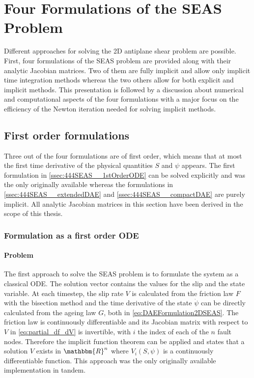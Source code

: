 \chapter{Four Formulations of the SEAS Problem}
\label{chap:44rmulations4SEAS}
Different approaches for solving the 2D antiplane shear problem are possible. First, four formulations of the SEAS problem are provided along with their analytic Jacobian matrices. Two of them are fully implicit and allow only implicit time integration methods whereas the two others allow for both explicit and implicit methods. This presentation is followed by a discussion about numerical and computational aspects of the four formulations with a major focus on the efficiency of the Newton iteration needed for solving implicit methods.

\section{First order formulations}
\label{sec:44mul4SEAS__1stOrderODE}
Three out of the four formulations are of first order, which means that at most the first time derivative of the physical quantities $S$ and $\psi$ appears. The first formulation in \autoref{ssec:444SEAS__1stOrderODE} can be solved explicitly and was the only originally available whereas the formulations in \autoref{ssec:444SEAS__extendedDAE} and \autoref{ssec:444SEAS__compactDAE} are purely implicit. All analytic Jacobian matrices in this section have been derived in the scope of this thesis.

\subsection{Formulation as a first order ODE}
\label{ssec:444SEAS__1stOrderODE}
\subsubsection{Problem}
The first approach to solve the SEAS problem is to formulate the system as a classical ODE. The solution vector contains the values for the slip and the state variable. At each timestep, the slip rate $V$ is calculated from the friction law $F$ with the bisection method and the time derivative of the state $\dot{\psi}$ can be directly calculated from the ageing law $G$, both in \autoref{eq:DAEFormulation2DSEAS}. The friction law is continuously differentiable and its Jacobian matrix with respect to $V$ in \autoref{eq:partial_df_dV} is invertible, with $i$ the index of each of the $n$ fault nodes. Therefore the implicit function theorem can be applied and states that a solution $V$ exists in $\mathbbm{R}^n$ where $V_i(S,\psi)$ is a continuously differentiable function. This approach was the only originally available implementation in {\ttfamily tandem}.

